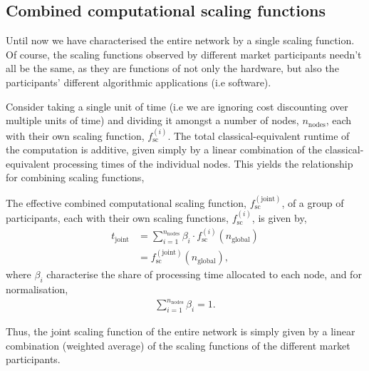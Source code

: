 %
%

\subsection{Combined computational scaling functions}\label{sec:comb_comp_sc_func}

Until now we have characterised the entire network by a single scaling function. Of course, the scaling functions observed by different market participants needn't all be the same, as they are functions of not only the hardware, but also the participants' different algorithmic applications (i.e software).

Consider taking a single unit of time (i.e we are ignoring cost discounting over multiple units of time) and dividing it amongst a number of nodes, $n_\mathrm{nodes}$, each with their own scaling function, $f_\mathrm{sc}^{(i)}$. The total classical-equivalent runtime of the computation is additive, given simply by a linear combination of the classical-equivalent processing times of the individual nodes. This yields the relationship for combining scaling functions,
\begin{definition}\label{def:comb_sc_func}
The effective combined computational scaling function, $f_\mathrm{sc}^\mathrm{(joint)}$, of a group of participants, each with their own scaling functions, $f_\mathrm{sc}^{(i)}$, is given by,
\begin{align}
	t_\mathrm{joint} &= \sum_{i=1}^{n_{\mathrm{nodes}}} \beta_i \cdot f_\mathrm{sc}^{(i)}(n_\mathrm{global}) \nonumber \\
	&= f_\mathrm{sc}^\mathrm{(joint)}(n_\mathrm{global}),
\end{align}
where $\beta_i$ characterise the share of processing time allocated to each node, and for normalisation,
\begin{align}
\sum_{i=1}^{n_\mathrm{nodes}} \beta_i = 1.
\end{align}

\end{definition}

Thus, the joint scaling function of the entire network is simply given by a linear combination (weighted average) of the scaling functions of the different market participants.

%
%

